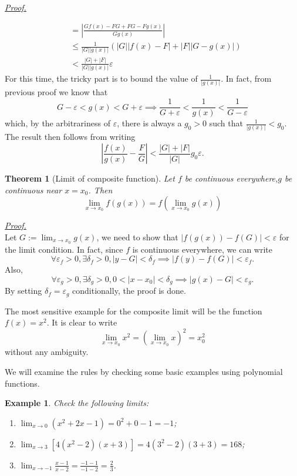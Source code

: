 \documentclass[12pt]{article}
\newtheorem*{theorem}{Theorem}
\newtheorem*{example}{Example}
\renewenvironment{proof}[1][Proof]{\begin{snugshade*} \underline{\textit{{#1}.}}\\}{\hfill \qedsymbol \end{snugshade*}}
\begin{document}
\begin{proof}
\begin{enumerate}
\begin{align*}
                &=|\frac{Gf(x)-FG+FG-Fg(x)}{Gg(x)}|\\
                &\leq \frac{1}{|G||g(x)|}(|G||f(x)-F|+|F||G-g(x)|)\\
                &<\frac{|G|+|F|}{|G||g(x)|}\varepsilon
            \end{align*}
            For this time, the tricky part is to bound the value of $\frac{1}{|g(x)|}$. In fact, from previous proof we know that \[G-\varepsilon<g(x)<G+\varepsilon \implies \frac{1}{G+\varepsilon}<\frac{1}{g(x)}<\frac{1}{G-\varepsilon}\] which, by the arbitrariness of $\varepsilon$, there is always a $g_0>0$ such that $\frac{1}{|g(x)|}<g_0$. The result then follows from writing \[|\frac{f(x)}{g(x)}-\frac{F}{G}|<\frac{|G|+|F|}{|G|}g_0\varepsilon.\]
        \end{enumerate}
    \end{proof}

    \begin{theorem}[Limit of composite function]
        Let $f$ be continuous everywhere,$g$ be continuous near $x=x_0$. Then \[\lim_{x\to x_0}f(g(x))=f(\lim_{x\to x_0}g(x))\]
    \end{theorem}

    \begin{proof}
        Let $G:=\displaystyle\lim_{x\to x_0}g(x)$, we need to show that $|f(g(x))-f(G)|<\varepsilon$ for the limit condition. In fact, since $f$ is continuous everywhere, we can write \[\forall \varepsilon_f > 0, \exists \delta_f > 0, |y-G|<\delta_f \implies |f(y)-f(G)|<\varepsilon_f.\]
        Also, \[\forall \varepsilon_g > 0, \exists \delta_g > 0, 0<|x-x_0|<\delta_g \implies |g(x)-G|<\varepsilon_g.\]
        By setting $\delta_f = \varepsilon_g$ conditionally, the proof is done.
    \end{proof}

    The most sensitive example for the composite limit will be the function $f(x)=x^2$. It is clear to write \[\lim_{x\to x_0} x^2 = (\lim_{x\to x_0} x)^2 = x_0^2\] without any ambiguity.

    We will examine the rules by checking some basic examples using polynomial functions.

    \begin{example}
        Check the following limits:\begin{enumerate}
            \item $\displaystyle\lim_{x\to 0}(x^2+2x-1)=0^2+0-1=-1$;
            \item $\displaystyle\lim_{x\to 3}[4(x^2-2)(x+3)]=4(3^2-2)(3+3)=168$;
            \item $\displaystyle\lim_{x\to -1}\frac{x-1}{x-2}=\frac{-1-1}{-1-2}=\frac{2}{3}$.
        \end{enumerate}
    \end{example}
\end{document}
